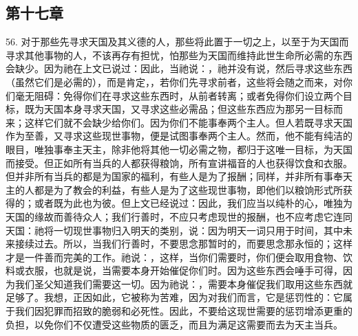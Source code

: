 
\subsection{第十七章}

56. 对于那些先寻求天国及其义德的人，那些将此置于一切之上，以至于为天国而寻求其他事物的人，不该再存有担忧，怕那些为天国而维持此世生命所必需的东西会缺少。因为祂在上文已说过：因此，当祂说：，祂并没有说，然后寻求这些东西（虽然它们是必需的），而是肯定，，若你们先寻求前者，这些将会随之而来，对你们毫无阻碍：免得你们在寻求这些东西时，从前者转离；或者免得你们设立两个目标，既为天国本身寻求天国，又寻求这些必需品；但这些东西应为那另一目标而来；这样它们就不会缺少给你们。因为你们不能事奉两个主人。但人若既寻求天国作为至善，又寻求这些现世事物，便是试图事奉两个主人。然而，他不能有纯洁的眼目，唯独事奉主天主，除非他将其他一切必需之物，都归于这唯一目标，为天国而接受。但正如所有当兵的人都获得粮饷，所有宣讲福音的人也获得饮食和衣服。但并非所有当兵的都是为国家的福利，有些人是为了报酬；同样，并非所有事奉天主的人都是为了教会的利益，有些人是为了这些现世事物，即他们以粮饷形式所获得的；或者既为此也为彼。但上文已经说过：因此，我们应当以纯朴的心，唯独为天国的缘故而善待众人；我们行善时，不应只考虑现世的报酬，也不应考虑它连同天国：祂将一切现世事物归入明天的类别，说：因为明天一词只用于时间，其中未来接续过去。所以，当我们行善时，不要思念那暂时的，而要思念那永恒的；这样才是一件善而完美的工作。祂说：，这样，当你们需要时，你们便会取用食物、饮料或衣服，也就是说，当需要本身开始催促你们时。因为这些东西会唾手可得，因为我们圣父知道我们需要这一切。因为祂说：，需要本身催促我们取用这些东西就足够了。我想，正因如此，它被称为苦难，因为对我们而言，它是惩罚性的：它属于我们因犯罪而招致的脆弱和必死性。因此，不要给这现世需要的惩罚增添更重的负担，以免你们不仅遭受这些物质的匮乏，而且为满足这需要而去为天主当兵。\par

